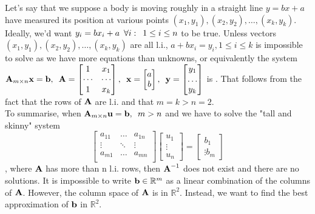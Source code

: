\documentclass[a4paper]{article}
\numberwithin{equation}{section} %
\newcounter{solution}
\newcommand{\setR}{\mathbb{R}} %
\newcommand{\hquad}{\hskip0.5em\relax}%
\newcommand{\B}[1]{\textbf{\textup{#1}}} %
\newcommand{\emphasis}[1]{\textls{#1}}
\begin{document}
Let's say that we suppose a body is moving roughly in a straight line $y = bx + a$ have measured its position at various points $(x_1,y_1),(x_2,y_2),\ldots, (x_k,y_k)$. Ideally, we'd want $y_i = bx_i + a \hquad \forall i: \hquad 1 \leq i \leq n$ to be true. Unless vectors $(x_1,y_1),(x_2,y_2),\ldots, (x_k,y_k)$ are all l.i., $a + bx_i = y_i, 1 \leq i \leq k$ is impossible to solve as we have more equations than unknowns, or equivalently the system $\B{A}_{m\times n}\B{x}=\B{b}, \hquad \B{A}=\begin{bmatrix}1 & x_1 \\ \cdots & \cdots \\ 1 & x_k \end{bmatrix}, \hquad \B{x}=\begin{bmatrix}a \\ b \end{bmatrix}, \hquad \B{y}=\begin{bmatrix}y_1 \\ \ldots \\ y_k \end{bmatrix}$ is \emphasis{overdetermined}. That follows from the fact that the rows of $\B{A}$ are l.i. and that $m=k>n=2$. \\
To summarise, when $\B{A}_{m \times n} \B{u} = \B{b}, \hquad m>n$ and we have to solve the "tall and skinny" system
\[
\begin{bmatrix}a_{11} & \ldots & a_{1n}\\ \vdots & \ddots & \vdots\\ a_{m1} & \ldots & a_{mn}\\ \end{bmatrix}
\begin{bmatrix}u_1 \\ \vdots \\u_n \end{bmatrix} = 
\begin{bmatrix}b_1 \\ \vdots b_m \end{bmatrix}
\]
, where $\B{A}$ has more than n l.i. rows, then $\B{A}^{-1}$ does not exist and there are no solutions. It is impossible to write $\B{b} \in \setR^m$ as a linear combination of the columns of $\B{A}$. However, the column space of $\B{A}$ is in $\setR^ 2$. Instead, we want to find the best approximation of $\B{b}$ in $\setR^2$.
\end{document}
